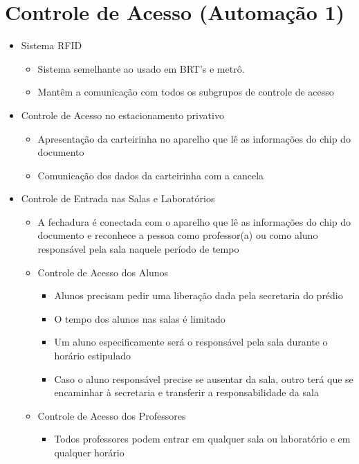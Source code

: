 \begin{apendicesenv}
\begin{itemize}
\begin{itemize}
      \end{itemize}
  \end{itemize}

\section{Controle de Acesso (Automação 1)}
  \begin{itemize}
    \item Sistema RFID
      \begin{itemize}
        \item Sistema semelhante ao usado em BRT’s e metrô.
        \item Mantêm a comunicação com todos os subgrupos de controle de acesso
      \end{itemize}
    \item Controle de Acesso no estacionamento privativo
      \begin{itemize}
        \item Apresentação da carteirinha no aparelho que lê as informações do chip do documento
        \item Comunicação dos dados da carteirinha com a cancela
      \end{itemize}
    \item  Controle de Entrada nas Salas e Laboratórios
      \begin{itemize}
        \item A fechadura é conectada com o aparelho que lê as informações do chip do documento e reconhece a pessoa como professor(a) ou como aluno responsável pela sala naquele período de tempo
        \item Controle de Acesso dos Alunos
        \begin{itemize}
        \item Alunos precisam pedir uma liberação dada pela secretaria do prédio
        \item O tempo dos alunos nas salas é limitado
        \item Um aluno especificamente será o responsável pela sala durante o horário estipulado
        \item Caso o aluno responsável precise se ausentar da sala, outro terá que se encaminhar à secretaria e transferir a responsabilidade da sala
        \end{itemize}
        \item Controle de Acesso dos Professores
        \begin{itemize}
        \item Todos professores podem entrar em qualquer sala ou laboratório e em qualquer horário

\end{itemize}
\end{itemize}
\end{itemize}
\end{apendicesenv}

